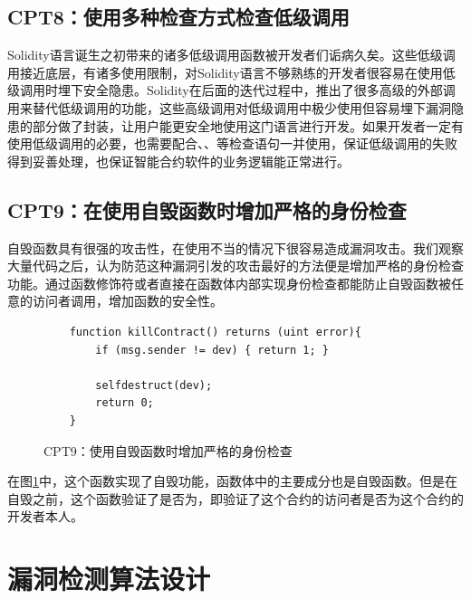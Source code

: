 \subsection{CPT8：使用多种检查方式检查低级调用}\label{sec:ss8}

Solidity语言诞生之初带来的诸多低级调用函数被开发者们诟病久矣。这些低级调用接近底层，有诸多使用限制，对Solidity语言不够熟练的开发者很容易在使用低级调用时埋下安全隐患。Solidity在后面的迭代过程中，推出了很多高级的外部调用来替代低级调用的功能，这些高级调用对低级调用中极少使用但容易埋下漏洞隐患的部分做了封装，让用户能更安全地使用这门语言进行开发。如果开发者一定有使用低级调用的必要，也需要配合、、等检查语句一并使用，保证低级调用的失败得到妥善处理，也保证智能合约软件的业务逻辑能正常进行。

\subsection{CPT9：在使用自毁函数时增加严格的身份检查}\label{sec:ss9}

自毁函数具有很强的攻击性，在使用不当的情况下很容易造成漏洞攻击。我们观察大量代码之后，认为防范这种漏洞引发的攻击最好的方法便是增加严格的身份检查功能。通过函数修饰符或者直接在函数体内部实现身份检查都能防止自毁函数被任意的访问者调用，增加函数的安全性。
\begin{figure}
\begin{minipage}[htbp]{1.0\linewidth}
    \begin{lstlisting}
    function killContract() returns (uint error){
        if (msg.sender != dev) { return 1; }

        selfdestruct(dev);
        return 0;
    }
    \end{lstlisting}
\end{minipage}
\vspace{-5mm}
\caption{CPT9：使用自毁函数时增加严格的身份检查}
\label{fig:ss9_example}
\end{figure}
在图\ref{fig:ss9_example}中，这个函数实现了自毁功能，函数体中的主要成分也是自毁函数。但是在自毁之前，这个函数验证了是否为，即验证了这个合约的访问者是否为这个合约的开发者本人。

\section{漏洞检测算法设计}

